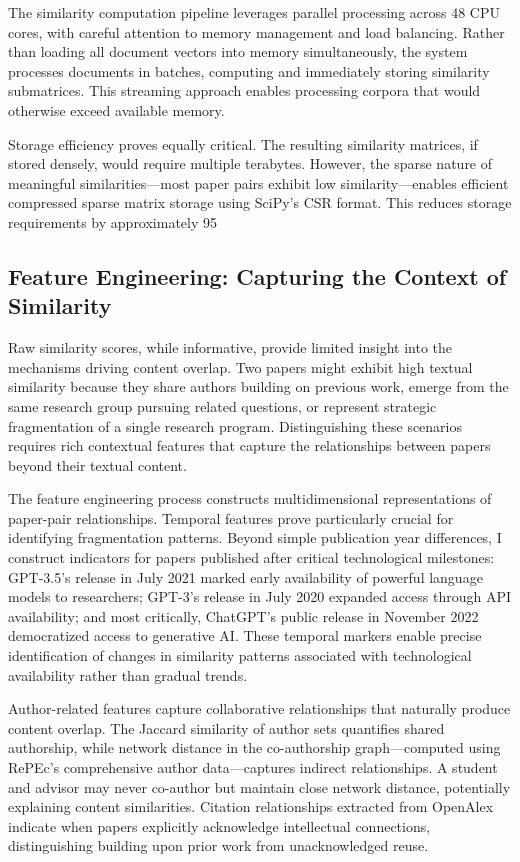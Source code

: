 \documentclass[12pt]{article}
\begin{document}
The similarity computation pipeline leverages parallel processing across 48 CPU cores, with careful attention to memory management and load balancing. Rather than loading all document vectors into memory simultaneously, the system processes documents in batches, computing and immediately storing similarity submatrices. This streaming approach enables processing corpora that would otherwise exceed available memory.

Storage efficiency proves equally critical. The resulting similarity matrices, if stored densely, would require multiple terabytes. However, the sparse nature of meaningful similarities—most paper pairs exhibit low similarity—enables efficient compressed sparse matrix storage using SciPy's CSR format. This reduces storage requirements by approximately 95%

\subsection{Feature Engineering: Capturing the Context of Similarity}

Raw similarity scores, while informative, provide limited insight into the mechanisms driving content overlap. Two papers might exhibit high textual similarity because they share authors building on previous work, emerge from the same research group pursuing related questions, or represent strategic fragmentation of a single research program. Distinguishing these scenarios requires rich contextual features that capture the relationships between papers beyond their textual content.

The feature engineering process constructs multidimensional representations of paper-pair relationships. Temporal features prove particularly crucial for identifying fragmentation patterns. Beyond simple publication year differences, I construct indicators for papers published after critical technological milestones: GPT-3.5's release in July 2021 marked early availability of powerful language models to researchers; GPT-3's release in July 2020 expanded access through API availability; and most critically, ChatGPT's public release in November 2022 democratized access to generative AI. These temporal markers enable precise identification of changes in similarity patterns associated with technological availability rather than gradual trends.

Author-related features capture collaborative relationships that naturally produce content overlap. The Jaccard similarity of author sets quantifies shared authorship, while network distance in the co-authorship graph—computed using RePEc's comprehensive author data—captures indirect relationships. A student and advisor may never co-author but maintain close network distance, potentially explaining content similarities. Citation relationships extracted from OpenAlex indicate when papers explicitly acknowledge intellectual connections, distinguishing building upon prior work from unacknowledged reuse.
\end{document}
